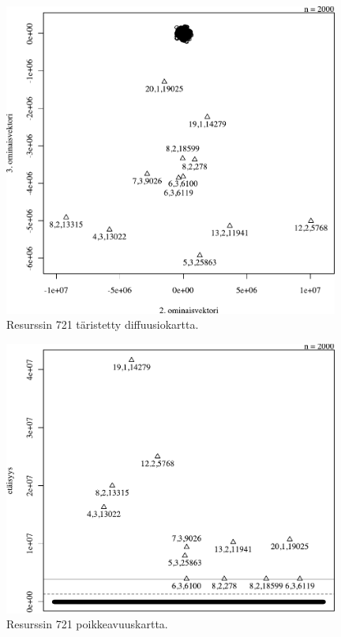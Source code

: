 \begin{figure}[p]
\centering
\includegraphics[width=11cm]{pics/diffuusiokuvat/service_721.pdf}
\caption{Resurssin 721 täristetty diffuusiokartta.}
\label{diffuusio_721}
\end{figure}

\begin{figure}[p]
\centering
\includegraphics[width=11cm]{pics/tiheyskuvat/service_721.pdf}
\caption{Resurssin 721 poikkeavuuskartta.}
\label{service_721}
\end{figure}

